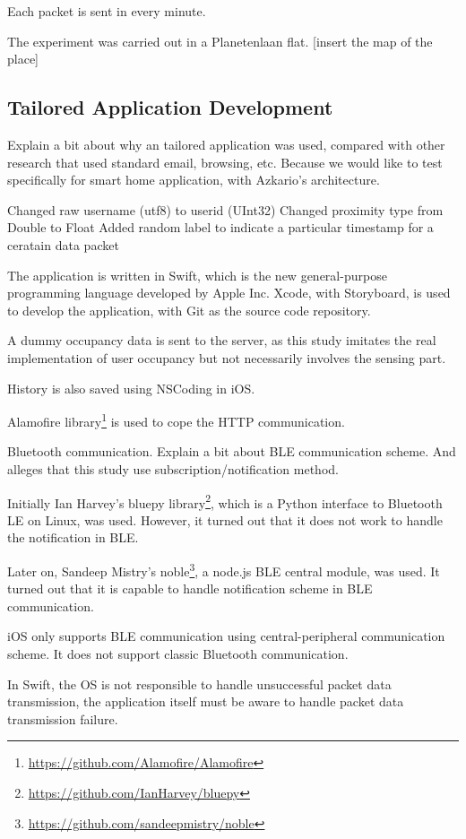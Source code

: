 \documentclass[journal]{vgtc}                %
\begin{document}
Each packet is sent in every minute.

The experiment was carried out in a Planetenlaan flat.
[insert the map of the place]

\subsection{Tailored Application Development} %
\label{sub:tailored_application_development}
Explain a bit about why an tailored application was used, compared with other research that used standard email, browsing, etc.
Because we would like to test specifically for smart home application, with Azkario's architecture.

Changed raw username (utf8) to userid (UInt32)
Changed proximity type from Double to Float
Added random label to indicate a particular timestamp for a ceratain data packet

The application is written in Swift, which is the new general-purpose programming language developed by Apple Inc. Xcode, with Storyboard, is used to develop the application, with Git as the source code repository.

A dummy occupancy data is sent to the server, as this study imitates the real implementation of user occupancy but not necessarily involves the sensing part.

History is also saved using NSCoding in iOS.

Alamofire library\footnote{\url{https://github.com/Alamofire/Alamofire}} is used to cope the HTTP communication.

Bluetooth communication.
Explain a bit about BLE communication scheme.
And alleges that this study use subscription/notification method.

Initially Ian Harvey's bluepy library\footnote{\url{https://github.com/IanHarvey/bluepy}}, which is a Python interface to Bluetooth LE on Linux, was used. However, it turned out that it does not work to handle the notification in BLE.

Later on, Sandeep Mistry's noble\footnote{\url{https://github.com/sandeepmistry/noble}}, a node.js BLE central module, was used. It turned out that it is capable to handle notification scheme in BLE communication.

iOS only supports BLE communication using central-peripheral communication scheme. It does not support classic Bluetooth communication.

In Swift, the OS is not responsible to handle unsuccessful packet data transmission, the application itself must be aware to handle packet data transmission failure.
\end{document}
